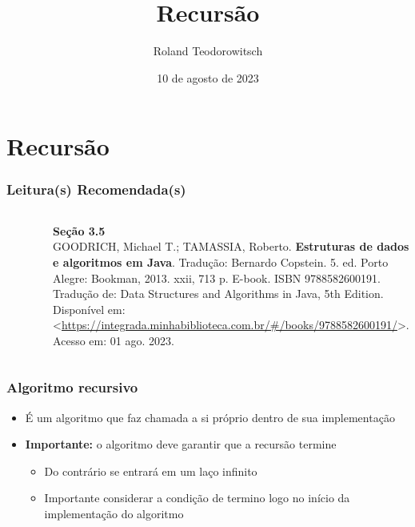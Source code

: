 \documentclass[aspectratio=169]{beamer}
\title[\sc{Recursão}]{Recursão}
\author[Roland Teodorowitsch]{Roland Teodorowitsch}
\institute[ALEST I - EP - PUCRS]{Algoritmos e Estruturas de Dados I - Escola Politécnica - PUCRS}
\date{10 de agosto de 2023}
\begin{document}
\justifying

\begin{frame}
	\titlepage
\end{frame}

\section{Recursão}

\begin{frame}\frametitle{Leitura(s) Recomendada(s)}

\begin{columns}[T]
\begin{column}{0.15\linewidth}
\vspace{-3mm}
\begin{figure}[h]
	\centering
	\includegraphics[height=0.3\paperheight]{imagens/livro_goodrich.jpg}
\end{figure}
\end{column}
\begin{column}{0.85\linewidth}
\vspace{3mm}
\textbf{Seção 3.5}\\
\scriptsize{GOODRICH, Michael T.; TAMASSIA, Roberto. \textbf{Estruturas de dados e algoritmos em Java}. Tradução: Bernardo Copstein. 5. ed. Porto Alegre: Bookman, 2013. xxii, 713 p. E-book. ISBN 9788582600191. Tradução de: Data Structures and Algorithms in Java, 5th Edition. Disponível em: \textless{}\url{https://integrada.minhabiblioteca.com.br/\#/books/9788582600191/}\textgreater{}. Acesso em: 01 ago. 2023.}
\end{column}
\end{columns}

\end{frame}

\begin{frame}\frametitle{Algoritmo recursivo}
\begin{itemize}
	\item É um algoritmo que faz chamada a si próprio dentro de sua implementação
	\item \textbf{Importante:} o algoritmo deve garantir que a recursão termine
	\begin{itemize}
		\item Do contrário se entrará em um laço infinito
		\item Importante considerar a condição de termino logo no início da implementação do algoritmo
	\end{itemize}
\end{itemize}
\end{frame}
\end{document}
